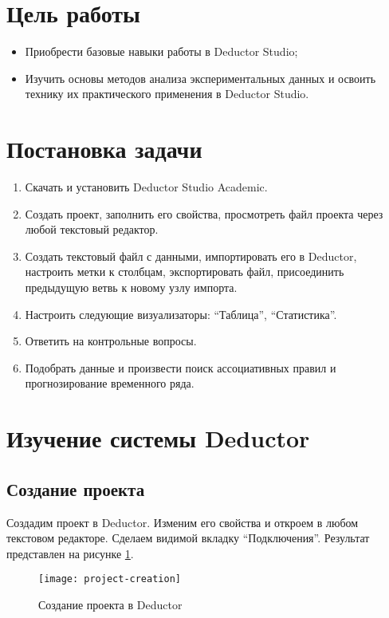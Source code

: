 \documentclass[a4paper,14pt]{extarticle}
\begin{document}


\section{Цель работы}
\begin{itemize}
    \item Приобрести базовые навыки работы в Deductor Studio;
    \item Изучить основы методов анализа экспериментальных данных и освоить
          технику их практического применения в Deductor Studio.
\end{itemize}

\section{Постановка задачи}
\begin{enumerate}
    \item Скачать и установить Deductor Studio Academic.
    \item Создать проект, заполнить его свойства, просмотреть файл проекта через
          любой текстовый редактор.
    \item Создать текстовый файл с данными, импортировать его в Deductor,
          настроить метки к столбцам, экспортировать файл, присоединить
          предыдущую ветвь к новому узлу импорта.
    \item Настроить следующие визуализаторы: \enquote{Таблица},
          \enquote{Статистика}.
    \item Ответить на контрольные вопросы.
    \item Подобрать данные и произвести поиск ассоциативных правил и
          прогнозирование временного ряда.
\end{enumerate}

\section{Изучение системы Deductor}
\subsection{Создание проекта}
Создадим проект в Deductor. Изменим его свойства и откроем в любом текстовом
редакторе. Сделаем видимой вкладку \enquote{Подключения}. Результат представлен
на рисунке \ref{fig:project-creation}.
\begin{figure}[H]
    \centering
    \texttt{[image: project-creation]}
    \caption{Создание проекта в Deductor}
    \label{fig:project-creation}
\end{figure}
\end{document}
